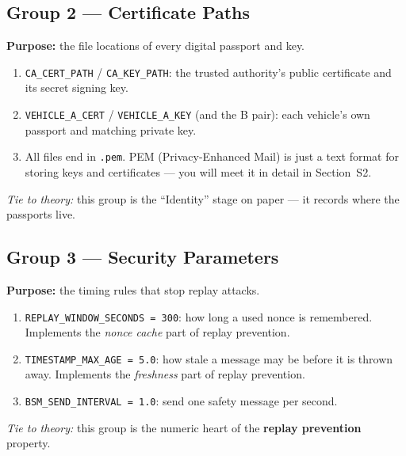 \documentclass[11pt,a4paper]{report}
\begin{document}
\subsection{Group 2 --- Certificate Paths}
\textbf{Purpose:} the file locations of every digital passport and key.
\begin{enumerate}
  \item \texttt{CA\_CERT\_PATH} / \texttt{CA\_KEY\_PATH}: the trusted authority's
        public certificate and its secret signing key.
  \item \texttt{VEHICLE\_A\_CERT} / \texttt{VEHICLE\_A\_KEY} (and the B pair):
        each vehicle's own passport and matching private key.
  \item All files end in \texttt{.pem}. PEM (Privacy-Enhanced Mail) is just a
        text format for storing keys and certificates --- you will meet it in
        detail in Section~S2.
\end{enumerate}
\emph{Tie to theory:} this group is the ``Identity'' stage on paper --- it
records where the passports live.

\subsection{Group 3 --- Security Parameters}
\textbf{Purpose:} the timing rules that stop replay attacks.
\begin{enumerate}
  \item \texttt{REPLAY\_WINDOW\_SECONDS = 300}: how long a used nonce is
        remembered. Implements the \emph{nonce cache} part of replay prevention.
  \item \texttt{TIMESTAMP\_MAX\_AGE = 5.0}: how stale a message may be before it
        is thrown away. Implements the \emph{freshness} part of replay
        prevention.
  \item \texttt{BSM\_SEND\_INTERVAL = 1.0}: send one safety message per second.
\end{enumerate}
\emph{Tie to theory:} this group is the numeric heart of the
\textbf{replay prevention} property.
\end{document}
